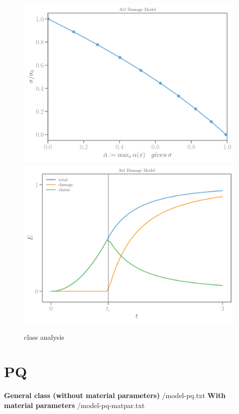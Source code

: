 \documentclass[]{article}
\begin{document}
\begin{figure}[htbp]
  \includegraphics[width=.33\textheight]{../figures/at1-maxalpha.pdf}
  \includegraphics[width=.33\textheight]{../figures/at1-energies-homog.pdf}
  \caption{class analysis}
  \label{fig:class-analyser}
\end{figure}

\section*{PQ}


\textbf{General class (without material parameters)}
{/model-pq.txt}
\textbf{With material parameters}
{/model-pq-matpar.txt}
\end{document}
